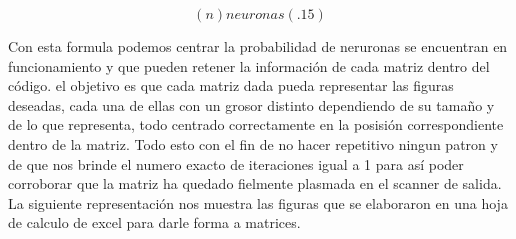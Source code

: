 \documentclass{report}
\begin{document}
\begin{equation}
   (n) neuronas (.15)
\end{equation}
 
{\large Con esta formula podemos centrar la probabilidad de neruronas se encuentran en funcionamiento y que pueden retener la información de cada matriz dentro del c\'odigo. el objetivo es que cada matriz dada pueda representar las figuras deseadas, cada una de ellas con un grosor distinto dependiendo de su tamaño y de lo que representa, todo centrado correctamente en la posisi\'on correspondiente dentro de la matriz. Todo esto con el fin de no hacer repetitivo ningun patron y de que nos brinde el numero exacto de iteraciones igual a 1 para así poder corroborar que la matriz ha quedado fielmente plasmada en el scanner de salida. La siguiente representación nos muestra las figuras que se elaboraron en una hoja de calculo de excel para darle forma a matrices.}

\vspace{1cm}
\end{document}
